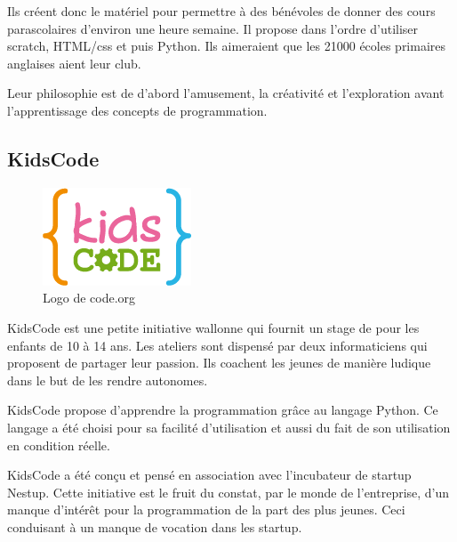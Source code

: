 Ils créent donc le matériel pour permettre à des bénévoles de donner des cours parascolaires d'environ une heure semaine. Il propose dans l'ordre d'utiliser scratch, HTML/css et puis Python. Ils aimeraient que les 21000 écoles primaires anglaises aient leur club.

Leur philosophie est de d'abord l'amusement, la créativité et l'exploration avant l'apprentissage des concepts de programmation.

\subsection{KidsCode}
\begin{figure}[!h]
  \begin{center}
    \includegraphics[scale=0.5]{content/5-related_work/images/kidscode}
    \caption{Logo de code.org}
    \label{fig:code.org}
  \end{center}
\end{figure}
KidsCode est une petite initiative wallonne qui fournit un stage de pour les enfants de 10 à 14 ans. Les ateliers sont dispensé par deux informaticiens qui proposent de partager leur passion. Ils coachent les jeunes de manière ludique dans le but de les rendre autonomes.

KidsCode propose d'apprendre la programmation grâce au langage Python. Ce langage a été choisi pour sa facilité d'utilisation et aussi du fait de son utilisation en condition réelle. 

KidsCode a été conçu et pensé en association avec l'incubateur de startup Nestup. Cette initiative est le fruit du constat, par le monde de l'entreprise, d'un manque d'intérêt pour la programmation de la part des plus jeunes. Ceci conduisant à un manque de vocation dans les startup.

